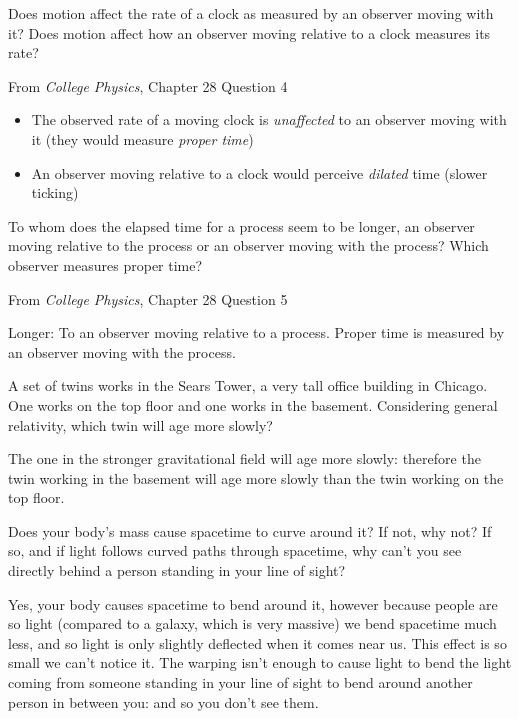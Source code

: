 \documentclass[addpoints,12pt]{exam}
\begin{document}
\begin{questions}
\question[2] Does motion affect the rate of a clock as measured by an observer moving with it? Does motion affect how an observer moving relative to a clock
measures its rate?

From \textit{College Physics}, Chapter 28 Question 4
\begin{TheSolution}
\begin{itemize}
	\item The observed rate of a moving clock is \textit{unaffected} to an observer moving with it (they would measure \textit{proper time})
	\item An observer moving relative to a clock would perceive \textit{dilated} time (slower ticking)
\end{itemize}
\end{TheSolution}

\question[2] To whom does the elapsed time for a process seem to be longer, an observer moving relative to the process or an observer moving with the
process? Which observer measures proper time?

From \textit{College Physics}, Chapter 28 Question 5
\begin{TheSolution}
Longer: To an observer moving relative to a process. Proper time is measured by an observer moving with the process.
\end{TheSolution}

\question[2] A set of twins works in the Sears Tower, a very tall office building in Chicago. One works on the top floor and one works in the basement. Considering general relativity, which twin will age more slowly?
\begin{TheSolution}
The one in the stronger gravitational field will age more slowly: therefore the twin working in the basement will age more slowly than the twin working on the top floor.
\end{TheSolution}

\question[2] Does your body's mass cause spacetime to curve around it? If not, why not? If so, and if light follows curved paths through spacetime, why can't you see directly behind a person standing in your line of sight?
\begin{TheSolution}
Yes, your body causes spacetime to bend around it, however because people are so light (compared to a galaxy, which is very massive) we bend spacetime much less, and so light is only slightly deflected when it comes near us. This effect is so small we can't notice it. The warping isn't enough to cause light to bend the light coming from someone standing in your line of sight to bend around another person in between you: and so you don't see them.
\end{TheSolution}


\end{questions}
\end{document}
